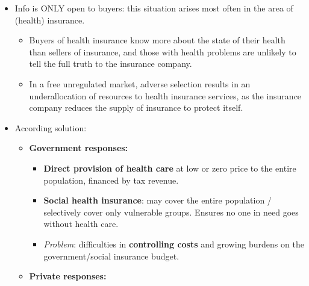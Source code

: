 \documentclass[a4paper,12pt]{article}
\begin{document}
\begin{itemize}
\begin{itemize}
      \begin{itemize}
        \item \textbf{Screening} (by the buyer): the party with limited information tries to learn more about the product/seller (e.g.\ online reviews, asking friends). \textit{Limitation}: cannot provide systematic, complete information to match the seller's knowledge.
        \item \textbf{Signalling} (by the seller): the party with more information tries to convince buyers of good quality (e.g.\ warranties, brand names, service records, fancy showrooms). \textit{Limitation}: unlikely to provide full information; may be inaccurate or misleading if sellers are eager to promote products.
      \end{itemize}
  \end{itemize}
  \item Info is ONLY open to buyers: this situation arises most often in the area of (health) insurance.
  \begin{itemize}
    \item Buyers of health insurance know more about the state of their health than sellers of insurance, and those with health problems are unlikely to tell the full truth to the insurance company.
    \item In a free unregulated market, adverse selection results in an underallocation of resources to health insurance services, as the insurance company reduces the supply of insurance to protect itself.
  \end{itemize}
  \item According solution:
  \begin{itemize}
    \item \textbf{Government responses:}
    \begin{itemize}
      \item \textbf{Direct provision of health care} at low or zero price to the entire population, financed by tax revenue.
      \item \textbf{Social health insurance}: may cover the entire population / selectively cover only vulnerable groups. Ensures no one in need goes without health care.
      \item \textit{Problem}: difficulties in \textbf{controlling costs} and growing burdens on the government/social insurance budget.
    \end{itemize}
    \item \textbf{Private responses:}
    \begin{itemize}

\end{itemize}
\end{itemize}
\end{itemize}
\end{document}
